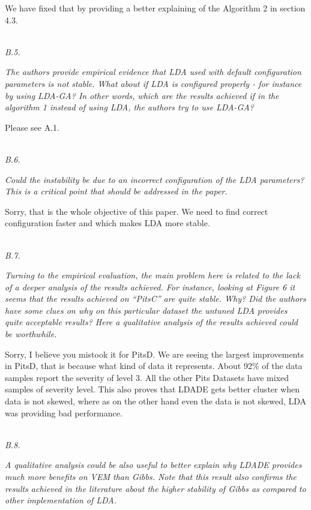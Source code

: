 \documentclass[conference]{IEEEtran}
\begin{document}
We have fixed that by providing a better explaining of the Algorithm 2 in section 4.3.

\noindent
\textit{\\B.5.}  

\textit{The authors provide empirical evidence that LDA used with default configuration parameters is not stable. What about if LDA is configured properly - for instance by using LDA-GA? In other words, which are the results achieved if in the algorithm 1 instead of using LDA, the authors try to use LDA-GA?\\}

Please see A.1.

\noindent
\textit{\\B.6.}  

\textit{Could the instability be due to an incorrect configuration of the LDA parameters? This is a critical point that should be addressed in the paper.\\}

Sorry, that is the whole objective of this paper. We need to find correct configuration faster and which makes LDA more stable.

\noindent
\textit{\\B.7.}   

\textit{Turning to the empirical evaluation, the main problem here is related to the lack of a deeper analysis of the results achieved. For instance, looking at Figure 6 it seems that the results achieved on “PitsC” are quite stable. Why? Did the authors have some clues on why on this particular dataset the untuned LDA provides quite acceptable results? Here a qualitative analysis of the results achieved could be worthwhile.\\}

Sorry, I believe you mistook it for PitsD. We are seeing the largest improvements in PitsD, that is because what kind of data it represents. About 92\% of the data samples report the severity of level 3.  All the other Pits Datasets have mixed samples of severity level. This also proves that LDADE gets better cluster when data is not skewed, where as on the other hand even the data is not skewed, LDA was providing bad performance.

\noindent
\textit{\\B.8.} 

\textit{A qualitative analysis could be also useful to better explain why LDADE provides much more benefits on VEM than Gibbs. Note that this result also confirms the results achieved in the literature about the higher stability of Gibbs as compared to other implementation of LDA.\\}
\end{document}

